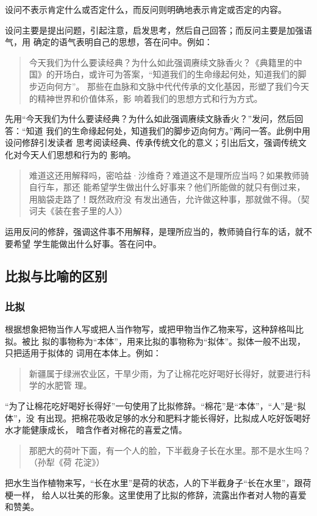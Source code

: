 \documentclass[final,oneside]{ctexbook}
\newenvironment{equotation}{\begin{quotation}\kaishu}{\end{quotation}}
\begin{document}
设问不表示肯定什么或否定什么，而反问则明确地表示肯定或否定的内容。

设问主要是提出问题，引起注意，启发思考，然后自己回答；而反问主要是加强语气，用
确定的语气表明自己的思想，答在问中。例如：
\begin{equotation}
  今天我们为什么要读经典？为什么如此强调赓续文脉香火？\linebreak[1]《典籍里的中
  国》的开场白，或许可为答案，“知道我们的生命缘起何处，知道我们的脚步迈向何方”。
  那些在血脉和文脉中代代传承的文化基因，形塑了我们今天的精神世界和价值体系，影
  响着我们的思想方式和行为方式。
\end{equotation}
先用“今天我们为什么要读经典？为什么如此强调赓续文脉香火？”发问，然后回答：“知道
我们的生命缘起何处，知道我们的脚步迈向何方。”两问一答。此例中用设问修辞引发读者
思考阅读经典、传承传统文化的意义；引出后文，强调传统文化对今天人们思想和行为的
影响。

\begin{equotation}
  难道这还用解释吗，密哈益·沙维奇？难道这不是理所应当吗？如果教师骑自行车，那还
  能希望学生做出什么好事来？他们所能做的就只有倒过来，用脑袋走路了！既然政府没
  有发出通告，允许做这种事，那就做不得。（契诃夫《装在套子里的人》）
\end{equotation}
运用反问的修辞，强调这件事不用解释，是理所应当的，教师骑自行车的话，就不要希望
学生能做出什么好事。答在问中。

\subsection{比拟与比喻的区别}

\subsubsection{比拟}

根据想象把物当作人写或把人当作物写，或把甲物当作乙物来写，这种辞格叫比拟。被比
拟的事物称为“本体”，用来比拟的事物称为“拟体”。拟体一般不出现，只把适用于拟体的
词用在本体上。例如：
\begin{equotation}
  新疆属于绿洲农业区，干旱少雨，为了让棉花吃好喝好长得好，就要进行科学的水肥管
  理。
\end{equotation}
“为了让棉花吃好喝好长得好”一句使用了比拟修辞。“棉花”是“本体”，“人”是“拟体”，没
有出现。把棉花吸收足够的水分和肥料才能长得好，比拟成人吃好饭喝好水才能健康成长，
暗含作者对棉花的喜爱之情。

\begin{equotation}
  那肥大的荷叶下面，有一个人的脸，下半截身子长在水里。那不是水生吗？（孙犁《荷
  花淀》）
\end{equotation}
把水生当作植物来写，“长在水里”是荷的状态，人的下半截身子“长在水里”，跟荷梗一样，
给人以壮美的形象。这里使用了比拟的修辞，流露出作者对人物的喜爱和赞美。
\end{document}
